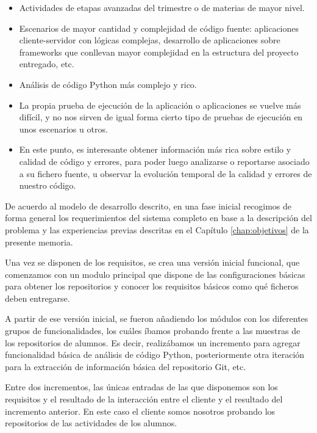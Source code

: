 \begin{itemize}
\item Actividades de etapas avanzadas del trimestre o de materias de mayor nivel.

\item Escenarios de mayor cantidad y complejidad de código fuente: aplicaciones cliente-servidor con lógicas complejas, desarrollo de aplicaciones sobre frameworks que conllevan mayor complejidad en la estructura del proyecto entregado, etc.

\item Análisis de código Python más complejo y rico.

\item La propia prueba de ejecución de la aplicación o aplicaciones se vuelve más difícil, y no nos sirven de igual forma cierto tipo de pruebas de ejecución en unos escenarios u otros.

\item En este punto, es interesante obtener información más rica sobre estilo y calidad de código y errores, para poder luego analizarse o reportarse asociado a su fichero fuente, u observar la evolución temporal de la calidad y errores de nuestro código.
\end{itemize}


De acuerdo al modelo de desarrollo descrito, en una fase inicial recogimos de forma general los requerimientos del sistema completo en base a la descripción del problema y las experiencias previas descritas en el Capítulo \ref{chap:objetivos} de la presente memoria.


Una vez se disponen de los requisitos, se crea una versión inicial funcional, que comenzamos con un modulo principal que dispone de las configuraciones básicas para obtener los repositorios y conocer los requisitos básicos como qué ficheros deben entregarse.


A partir de ese versión inicial, se fueron añadiendo los módulos con los diferentes grupos de funcionalidades, los cuáles íbamos probando frente a las muestras de los repositorios de alumnos. Es decir, realizábamos un incremento para agregar funcionalidad básica de análisis de código Python, posteriormente otra iteración para la extracción de información básica del repositorio Git, etc.


Entre dos incrementos, las únicas entradas de las que disponemos son los requisitos y el resultado de la interacción entre el cliente y el resultado del incremento anterior. En este caso el cliente somos nosotros probando los repositorios de las actividades de los alumnos.


